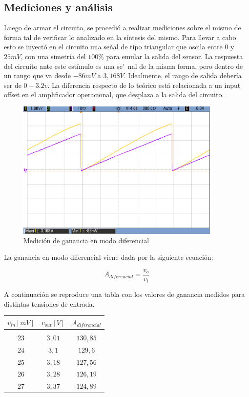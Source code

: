 \subsection{Mediciones y an\'alisis}

Luego de armar el circuito, se procedi\'o a realizar mediciones sobre el mismo de forma tal de verificar lo analizado en la s\'intesis del mismo. Para llevar a cabo esto se inyect\'o en el circuito una se\~nal de tipo triangular que oscila entre $0$ y $25mV$, con una simetr\'ia del $100\%$ para emular la salida del sensor. La respuesta del circuito ante este est\'imulo es una se\'~nal de la misma forma, pero dentro de un rango que va desde $-86mV$ a $3,168V$. Idealmente, el rango de salida deber\'ia ser de $0 - 3.2v$. La diferencia respecto de lo te\'orico est\'a relacionada a un input offset en el amplificador operacional, que desplaza a la salida del circuito.

\begin{figure}[H]
    \centering
    \includegraphics[width=0.9\textwidth]{../EJ4/resources/difmode_med.png}
	\caption{Medici\'on de ganancia en modo diferencial}
   	\label{fig:EJ4_difmodegain}
\end{figure}

La ganancia en modo diferencial viene dada por la siguiente ecuaci\'on:

\begin{equation}
	A_{diferencial} = \frac{v_o}{v_i}
\end{equation}

A continuaci\'on se reproduce una tabla con los valores de ganancia medidos para distintas tensiones de entrada.

\begin{table}[H]
    \centering
    \begin{tabular}{c c c}
        $v_{in} [mV]$ & $v_{out} [V]$ & $A_{diferencial}$ \\
        \hline \\
        $23$ & $3,01$ & $130,85$ \\
        $24$ & $3,1$ & $129,6$ \\
        $25$ & $3,18$ & $127,56$ \\
        $26$ & $3,28$ & $126,19$ \\
        $27$ & $3,37$ & $124,89$ \\
        \hline
    \end{tabular}
\end{table}

